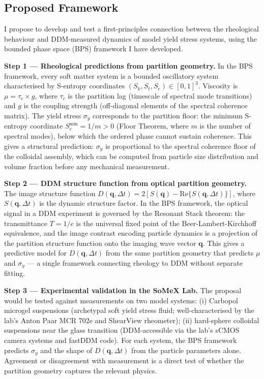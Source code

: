 \documentclass[12pt,a4paper]{article}
\begin{document}
\subsection*{Proposed Framework}

I propose to develop and test a first-principles connection between the
rheological behaviour and DDM-measured dynamics of model yield stress systems,
using the bounded phase space (BPS) framework I have developed.

\textbf{Step 1 --- Rheological predictions from partition geometry.}
In the BPS framework, every soft matter system is a bounded oscillatory system
characterised by S-entropy coordinates $(S_k, S_t, S_e) \in [0,1]^3$.
Viscosity is $\mu = \tau_c \times g$, where $\tau_c$ is the partition lag
(timescale of spectral mode transitions) and $g$ is the coupling strength
(off-diagonal elements of the spectral coherence matrix).
The yield stress $\sigma_y$ corresponds to the partition floor: the minimum
S-entropy coordinate $S_e^{\min} = 1/m > 0$ (Floor Theorem, where $m$ is the
number of spectral modes), below which the ordered phase cannot sustain coherence.
This gives a structural prediction: $\sigma_y$ is proportional to the spectral
coherence floor of the colloidal assembly, which can be computed from particle
size distribution and volume fraction before any mechanical measurement.

\textbf{Step 2 --- DDM structure function from optical partition geometry.}
The image structure function $D(\mathbf{q}, \Delta t) = 2[S(\mathbf{q}) -
\mathrm{Re}\{S(\mathbf{q}, \Delta t)\}]$, where $S(\mathbf{q}, \Delta t)$
is the dynamic structure factor.
In the BPS framework, the optical signal in a DDM experiment is governed by
the Resonant Stack theorem: the transmittance $T = 1/e$ is the universal
fixed point of the Beer-Lambert-Kirchhoff equivalence, and the image contrast
encoding particle dynamics is a projection of the partition structure function
onto the imaging wave vector $\mathbf{q}$.
This gives a predictive model for $D(\mathbf{q}, \Delta t)$ from the same
partition geometry that predicts $\mu$ and $\sigma_y$ --- a single framework
connecting rheology to DDM without separate fitting.

\textbf{Step 3 --- Experimental validation in the SoMeX Lab.}
The proposal would be tested against measurements on two model systems:
(i) Carbopol microgel suspensions (archetypal soft yield stress fluid;
well-characterised by the lab's Anton Paar MCR 702e and ShearView rheometer);
(ii) hard-sphere colloidal suspensions near the glass transition
(DDM-accessible via the lab's sCMOS camera systems and fastDDM code).
For each system, the BPS framework predicts $\sigma_y$ and the shape of
$D(\mathbf{q}, \Delta t)$ from the particle parameters alone.
Agreement or disagreement with measurement is a direct test of whether the
partition geometry captures the relevant physics.
\end{document}
